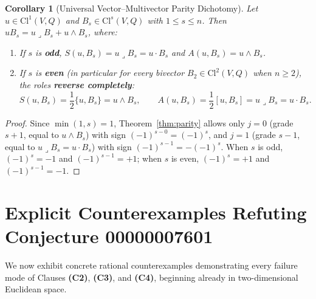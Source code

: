 \documentclass[11pt]{article}
\theoremstyle{plain}
\newtheorem{corollary}[theorem]{Corollary}
\theoremstyle{definition}
\theoremstyle{remark}
\newcommand{\Cl}{\mathrm{Cl}}
\newcommand{\lcontract}{\mathbin{\lrcorner}}
\begin{document}
\begin{corollary}[Universal Vector--Multivector Parity Dichotomy]\label{cor:vec-biv}
Let $u \in \Cl^1(V, Q)$ and $B_s \in \Cl^s(V, Q)$ with $1 \le s \le n$. Then $u B_s = u \lcontract B_s + u \wedge B_s$, where:
\begin{enumerate}
  \item[(i)] If $s$ is \textbf{odd}, $S(u, B_s) = u \lcontract B_s = u \cdot B_s$ and $A(u, B_s) = u \wedge B_s$.
  \item[(ii)] If $s$ is \textbf{even} (in particular for every bivector $B_2 \in \Cl^2(V, Q)$ when $n \ge 2$), the roles \textbf{reverse completely}:
  \begin{equation}\label{eq:reversal}
    S(u, B_s) = \frac{1}{2}\{u, B_s\} = u \wedge B_s, \qquad
    A(u, B_s) = \frac{1}{2}[u, B_s] = u \lcontract B_s = u \cdot B_s.
  \end{equation}
\end{enumerate}
\end{corollary}
\begin{proof}
Since $\min(1, s) = 1$, Theorem~\ref{thm:parity} allows only $j = 0$ (grade $s + 1$, equal to $u \wedge B_s$) with sign $(-1)^{s - 0} = (-1)^s$, and $j = 1$ (grade $s - 1$, equal to $u \lcontract B_s = u \cdot B_s$) with sign $(-1)^{s - 1} = -(-1)^s$. When $s$ is odd, $(-1)^s = -1$ and $(-1)^{s-1} = +1$; when $s$ is even, $(-1)^s = +1$ and $(-1)^{s-1} = -1$.
\end{proof}

\section{Explicit Counterexamples Refuting Conjecture 00000007601}

We now exhibit concrete rational counterexamples demonstrating every failure mode of Clauses \textbf{(C2)}, \textbf{(C3)}, and \textbf{(C4)}, beginning already in two-dimensional Euclidean space.
\end{document}
